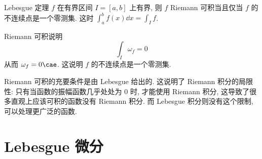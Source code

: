 \begin{thm}
    {Lebesgue 定理}
    \(f\) 在有界区间 \(I=[a,b]\) 上有界, 则 \(f\) Riemann 可积当且仅当 \(f\) 的不连续点是一个零测集. 这时 \(\int_a^b f(x)\dd{x}=\int_I f\).
\end{thm}
\begin{prf}
    Riemann 可积说明
    \[\int_I \omega_f = 0\]
    从而 \(\omega_f=0\cae\). 这说明 \(f\) 的不连续点是一个零测集.
\end{prf}
\begin{rmk}
    Riemann 可积的充要条件是由 Lebesgue 给出的. 这说明了 Riemann 积分的局限性: 只有当函数的振幅函数几乎处处为 0 时, 才能使用 Riemann 积分, 这导致了很多直观上应该可积的函数没有 Riemann 积分. 而 Lebesgue 积分则没有这个限制, 可以处理更广泛的函数.
\end{rmk}
\section{Lebesgue 微分}
